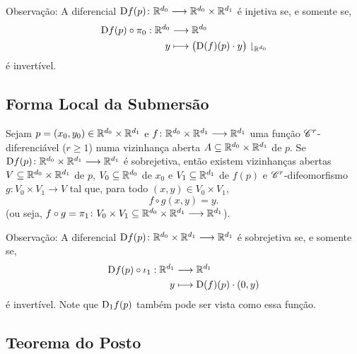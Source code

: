 Observação: A diferencial $\mathrm{D} f(p)\colon \mathbb{R}^{d_0} \longrightarrow \mathbb{R}^{d_0} \times \mathbb{R}^{d_1}$ é injetiva se, e somente se,
	\begin{align*}
	{\mathrm{D}f(p) \circ \pi_0}: {\mathbb{R}^{d_0}} &\longrightarrow {\mathbb{R}^{d_0}} \\{y} &\longmapsto {\big(\mathrm{D}(f)(p) \cdot y\big)\downharpoonright_{\mathbb{R}^{d_0}}}
	\end{align*}
é invertível.


\subsection{Forma Local da Submersão}

\begin{prop}

Sejam $p=(x_0,y_0) \in \mathbb{R}^{d_0} \times \mathbb{R}^{d_1}$ e $f\colon \mathbb{R}^{d_0} \times \mathbb{R}^{d_1} \longrightarrow \mathbb{R}^{d_1}$ uma função $\mathscr{C}^r$-diferenciável ($r \geq 1$) numa vizinhança aberta $A \subseteq \mathbb{R}^{d_0} \times \mathbb{R}^{d_1}$ de $p$. Se $\mathrm{D} f(p)\colon \mathbb{R}^{d_0} \times \mathbb{R}^{d_1} \longrightarrow \mathbb{R}^{d_1}$ é sobrejetiva, então existem vizinhanças abertas $V \subseteq \mathbb{R}^{d_0} \times \mathbb{R}^{d_1}$ de $p$, $V_0 \subseteq \mathbb{R}^{d_0}$ de $x_0$ e $V_1 \subseteq \mathbb{R}^{d_1}$ de $f(p)$ e $\mathscr{C}^r$-difeomorfismo $g\colon V_0 \times V_1 \to V$ tal que, para todo $(x,y) \in V_0 \times V_1$,
	\begin{equation*}
	f \circ g(x,y)=y.
	\end{equation*}
(ou seja, $f \circ g = \pi_1\colon V_0 \times V_1 \subseteq \mathbb{R}^{d_0} \times \mathbb{R}^{d_1} \longrightarrow \mathbb{R}^{d_1}$).
\end{prop}

Observação: A diferencial $\mathrm{D} f(p)\colon \mathbb{R}^{d_0} \times \mathbb{R}^{d_1} \longrightarrow \mathbb{R}^{d_1}$ é sobrejetiva se, e somente se,
	\begin{align*}
	{\mathrm{D}f(p) \circ \iota_1}: {\mathbb{R}^{d_1}} &\longrightarrow {\mathbb{R}^{d_1}} \\{y} &\longmapsto {\mathrm{D}(f)(p) \cdot (0,y)}
	\end{align*}
é invertível. Note que $\mathrm{D}_1 f(p)$ também pode ser vista como essa função.

\subsection{Teorema do Posto}

